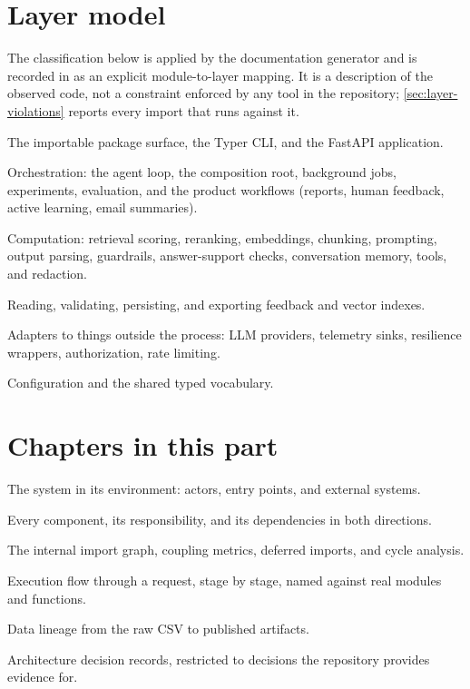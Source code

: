 \section{Layer model}

The classification below is applied by the documentation generator and is
recorded in  as an explicit
module-to-layer mapping. It is a description of the observed code, not a
constraint enforced by any tool in the repository; \cref{sec:layer-violations}
reports every import that runs against it.

\begin{description}[nosep]
  \item[Interface] The importable package surface, the Typer CLI, and the
    FastAPI application.
  \item[Application] Orchestration: the agent loop, the composition root,
    background jobs, experiments, evaluation, and the product workflows
    (reports, human feedback, active learning, email summaries).
  \item[Domain] Computation: retrieval scoring, reranking, embeddings,
    chunking, prompting, output parsing, guardrails, answer-support checks,
    conversation memory, tools, and redaction.
  \item[Data] Reading, validating, persisting, and exporting feedback and
    vector indexes.
  \item[Infrastructure] Adapters to things outside the process: LLM providers,
    telemetry sinks, resilience wrappers, authorization, rate limiting.
  \item[Foundation] Configuration and the shared typed vocabulary.
\end{description}



\section{Chapters in this part}

\begin{description}[nosep]
  \item[\cref{ch:system-context}] The system in its environment: actors,
    entry points, and external systems.
  \item[\cref{ch:components}] Every component, its responsibility, and its
    dependencies in both directions.
  \item[\cref{ch:dependencies}] The internal import graph, coupling metrics,
    deferred imports, and cycle analysis.
  \item[\cref{ch:runtime}] Execution flow through a request, stage by stage,
    named against real modules and functions.
  \item[\cref{ch:data-flow}] Data lineage from the raw CSV to published
    artifacts.
  \item[\cref{ch:adr}] Architecture decision records, restricted to decisions
    the repository provides evidence for.
\end{description}







